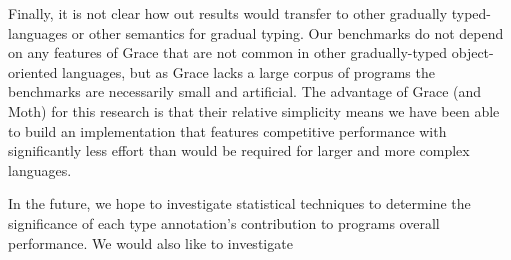 \documentclass[sigplan,10pt,review,screen]{acmart}\settopmatter{printfolios=true}
\begin{document}
Finally, it is not clear how out results would transfer
to other gradually typed-languages or other semantics for gradual typing.
Our benchmarks do not depend on any features of Grace
that are not common in other gradually-typed object-oriented
languages, but as Grace lacks a large corpus of programs the
benchmarks are necessarily small and artificial.
The advantage of Grace (and Moth) for this research is
that their relative simplicity means we have been able to build an
implementation that features competitive performance with significantly less
effort than would be required for larger and more complex languages.

In the future, we hope to investigate statistical techniques to
determine the significance of each type annotation's contribution to
programs overall performance.  We would also like to investigate 



\end{document}
